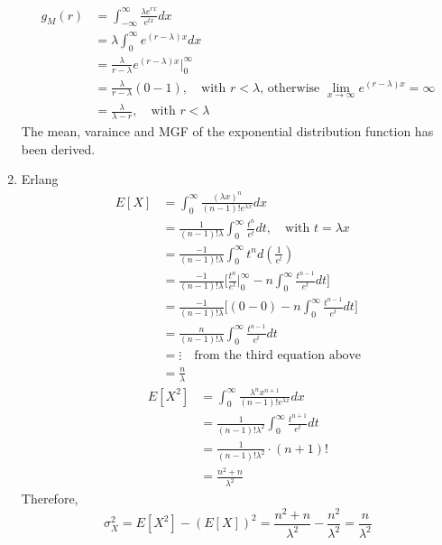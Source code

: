 \documentclass[UTF8]{article}
\begin{document}
\begin{enumerate}
        \begin{equation*}
          \begin{split}
             g_M(r) & =\int_{-\infty}^{\infty}\frac{\lambda e^{rx}}{e^{tx}}dx \\
               & =\lambda\int_{0}^{\infty}e^{(r-\lambda)x}dx\\
               & =\frac{\lambda}{r-\lambda}e^{(r-\lambda)x}\big|^\infty_0\\
               &=\frac{\lambda}{r-\lambda}(0-1),\quad\text{with $r<\lambda$, otherwise $\lim_{x\rightarrow\infty}e^{(r-\lambda)x}=\infty$}\\
               &=\frac{\lambda}{\lambda-r},\quad\text{with $r<\lambda$}
          \end{split}
        \end{equation*}
        The mean, varaince and MGF of the exponential distribution function has been derived.
        \item Erlang
            \begin{equation*}
                \begin{split}
                    E[X] &=\int_{0}^\infty\frac{(\lambda x)^{n}}{(n-1)!e^{\lambda x}}dx\\
                    &=\frac{1}{(n-1)!\lambda}\int_0^\infty\frac{t^n}{e^t}dt,\quad\text{with $t=\lambda x$}\\
                    &=\frac{-1}{(n-1)!\lambda}\int_0^\infty t^nd(\frac{1}{e^t})\\
                    &=\frac{-1}{(n-1)!\lambda}\bigg[\frac{t^n}{e^t}\bigg|^\infty_0-n\int^\infty_0\frac{t^{n-1}}{e^t}dt\bigg]\\
                    &=\frac{-1}{(n-1)!\lambda}\bigg[(0-0)-n\int^\infty_0\frac{t^{n-1}}{e^t}dt\bigg]\\
                    &=\frac{n}{(n-1)!\lambda}\int^\infty_0\frac{t^{n-1}}{e^t}dt\\
                    &=\vdots\quad\text{from the third equation above}\\
                    &=\frac{n}{\lambda}
                \end{split}
            \end{equation*}
            \begin{equation*}
                \begin{split}
                    E[X^2] &= \int^\infty_{0}\frac{\lambda^nx^{n+1}}{(n-1)!e^{\lambda x}}dx\\
                    &= \frac{1}{(n-1)!\lambda^2}\int_0^\infty\frac{t^{n+1}}{e^t}dt\\
                    &= \frac{1}{(n-1)!\lambda^2}\cdot(n+1)!\\
                    &= \frac{n^2+n}{\lambda^2}
                \end{split}
            \end{equation*}
            Therefore, 
            \begin{equation*}
                \sigma^2_X=E[X^2]-(E[X])^2=\frac{n^2+n}{\lambda^2}-\frac{n^2}{\lambda^2}=\frac{n}{\lambda^2}
            \end{equation*}


\end{enumerate}
\end{document}
